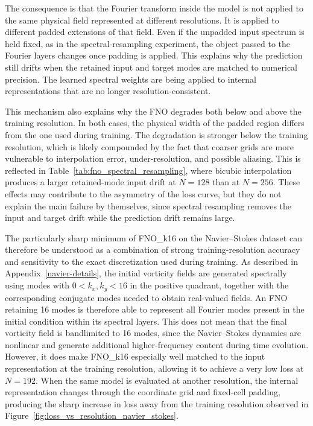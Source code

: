 The consequence is that the Fourier transform inside the model is not applied to the same physical field represented at different resolutions. It is applied to different padded extensions of that field. Even if the unpadded input spectrum is held fixed, as in the spectral-resampling experiment, the object passed to the Fourier layers changes once padding is applied. This explains why the prediction still drifts when the retained input and target modes are matched to numerical precision. The learned spectral weights are being applied to internal representations that are no longer resolution-consistent.

This mechanism also explains why the FNO degrades both below and above the training resolution. In both cases, the physical width of the padded region differs from the one used during training. The degradation is stronger below the training resolution, which is likely compounded by the fact that coarser grids are more vulnerable to interpolation error, under-resolution, and possible aliasing. This is reflected in Table~\ref{tab:fno_spectral_resampling}, where bicubic interpolation produces a larger retained-mode input drift at \(N=128\) than at \(N=256\). These effects may contribute to the asymmetry of the loss curve, but they do not explain the main failure by themselves, since spectral resampling removes the input and target drift while the prediction drift remains large.

The particularly sharp minimum of FNO\_k16 on the Navier--Stokes dataset can therefore be understood as a combination of strong training-resolution accuracy and sensitivity to the exact discretization used during training. As described in Appendix~\ref{navier-details}, the initial vorticity fields are generated spectrally using modes with \(0<k_x,k_y<16\) in the positive quadrant, together with the corresponding conjugate modes needed to obtain real-valued fields. An FNO retaining 16 modes is therefore able to represent all Fourier modes present in the initial condition within its spectral layers. This does not mean that the final vorticity field is bandlimited to 16 modes, since the Navier--Stokes dynamics are nonlinear and generate additional higher-frequency content during time evolution. However, it does make FNO\_k16 especially well matched to the input representation at the training resolution, allowing it to achieve a very low loss at \(N=192\). When the same model is evaluated at another resolution, the internal representation changes through the coordinate grid and fixed-cell padding, producing the sharp increase in loss away from the training resolution observed in Figure~\ref{fig:loss_vs_resolution_navier_stokes}.

